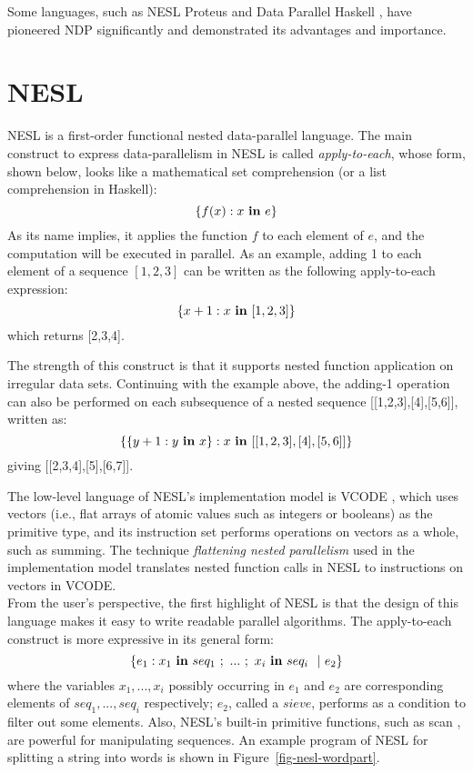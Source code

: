 Some languages, such as NESL \cite{blel95nesl,Blel-imp,Blel96-proof} Proteus \cite{prins93,Ppw95-workeff} and Data
Parallel Haskell \cite{Chak07,PeytonJones08,Lippmeier:2012}, have pioneered NDP significantly and demonstrated its advantages and importance.


\section{NESL}
NESL is a first-order functional nested data-parallel language. The main construct to express data-parallelism in NESL is called \emph{apply-to-each}, whose form, shown below, looks like a mathematical set comprehension (or a list comprehension in Haskell):
$$\{f(x) : x \ \mathbf{in} \ e \} $$
As its name implies, it applies the function $f$ to each element of $e$, and the computation will be executed in parallel.
As an example, adding 1 to each element of a sequence $[1,2,3]$ can be written as the following apply-to-each expression:
$$ \{x+1 : x \ \mathbf{in} \ [1,2,3] \}$$
which returns [2,3,4].

The strength of this construct is that it supports nested function application on irregular data sets. 
Continuing with the example above, the adding-1 operation can also be performed on each subsequence of a nested sequence [[1,2,3],[4],[5,6]], written as: 
$$\{\{y+1: y \ \*{in} \ x\}: x \ \*{in} \ [[1,2,3],[4],[5,6]]\}$$
giving [[2,3,4],[5],[6,7]].


The low-level language of NESL's implementation model is VCODE \cite{Blel-imp}, which uses vectors (i.e., flat arrays of atomic values such as integers or booleans) as the primitive type, and its instruction set performs operations on vectors as a whole, such as summing. 
The technique \emph{flattening nested parallelism} \cite{Blel-flatten} used in the implementation model translates nested function calls in NESL to instructions on vectors in VCODE. \\

From the user's perspective, the first highlight of NESL is that the design of this language makes it easy to write readable parallel algorithms. The apply-to-each construct is more expressive in its general form:
$$ \{ e_1 :  x_1 \ \*{in} \ seq_1 \ ; \ ... \ ; \ x_i \  \*{in} \ seq_i \ \ | \ e_2  \}$$
where the variables $x_1, ...,x_i$ possibly occurring in $e_1$ and $e_2$ are corresponding elements of $seq_1,...,seq_i$ respectively; $e_2$, called a $sieve$, performs as a condition to filter out some elements. 
Also, NESL's built-in primitive functions, such as scan \cite{blel89scan}, are powerful for manipulating sequences.
An example program of NESL for splitting a string into words is shown in Figure~\ref{fig-nesl-wordpart}.


